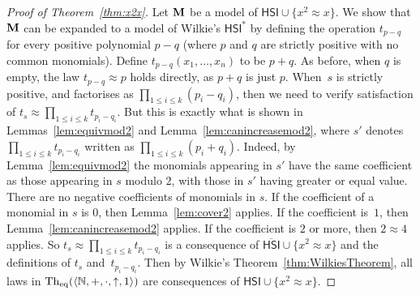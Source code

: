 \documentclass[eqnor,reqno]{amsart}
\theoremstyle{plain}
\theoremstyle{definition}
\newcommand{\Th}{\operatorname{Th}}
\newcommand{\HSI}{\textsf{HSI}}
\begin{document}
\begin{proof}[Proof of Theorem~\ref{thm:x2x}]
Let ${\bf M}$ be a model of $\HSI\cup\{x^2\approx x\}$.  We show that ${\bf M}$ can be expanded to a model of Wilkie's $\HSI^*$ by defining the operation $t_{p-q}$ for every positive polynomial $p-q$ (where $p$ and $q$ are strictly positive with no common monomials).  
Define $t_{p-q}(x_1,\dots,x_n)$ to be $p+q$.   As before, when $q$ is empty, the law $t_{p-q}\approx p$ holds directly, as $p+q$ is just $p$.  
When~$s$ is strictly positive, and factorises as $\prod_{1\leq i\leq k}(p_i-q_i)$, then we need to verify satisfaction of $t_s\approx \prod_{1\leq i\leq k}t_{p_i-q_i}$.  But this is exactly what is shown in Lemmas~\ref{lem:equivmod2} and Lemma~\ref{lem:canincreasemod2}, where $s'$ denotes $\prod_{1\leq i\leq k}t_{p_i-q_i}$ written as $\prod_{1\leq i\leq k}(p_i+q_i)$.  
Indeed, by Lemma~\ref{lem:equivmod2} the monomials appearing in $s'$ have the same coefficient as those appearing in $s$ modulo $2$, with those in $s'$ having greater or equal value.  There are no negative coefficients of monomials in $s$. If the coefficient of a monomial in $s$ is $0$, then Lemma~\ref{lem:cover2} applies.  If the coefficient is~$1$, then Lemma~\ref{lem:canincreasemod2} applies.  If the coefficient is $2$ or more, then $2\approx 4$ applies.
So $t_s\approx \prod_{1\leq i\leq k}t_{p_i-q_i}$ is a consequence of $\overline{\HSI}\cup\{x^2\approx x\}$ and the definitions of $t_s$ and~$t_{p_i-q_i}$.
Then by Wilkie's Theorem~\ref{thm:WilkiesTheorem}, all laws in $\Th_{\rm eq}(\langle\mathbb{N},+,\cdot,\uparrow,1\rangle)$ are consequences of $\HSI\cup\{x^2\approx x\}$.
\end{proof}
\end{document}
